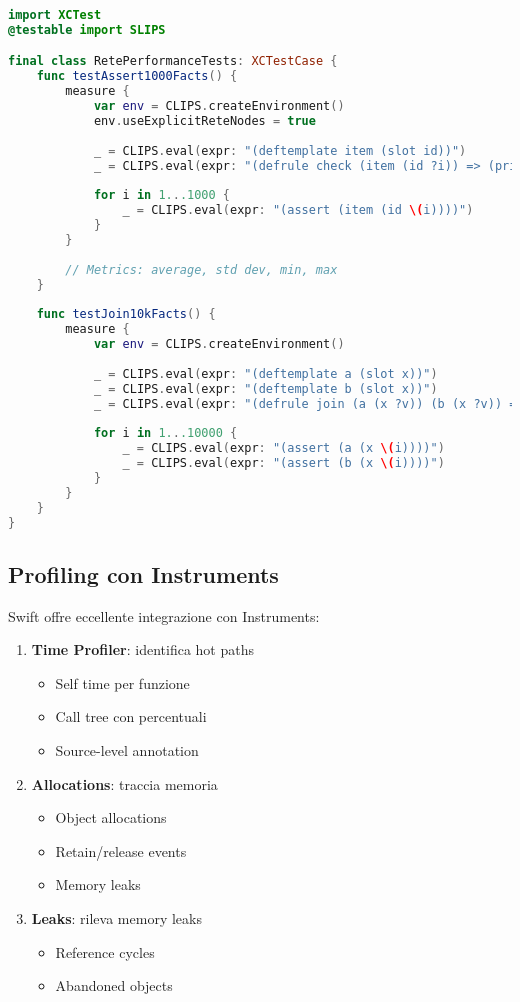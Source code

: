 \begin{lstlisting}[language=Swift]
import XCTest
@testable import SLIPS

final class RetePerformanceTests: XCTestCase {
    func testAssert1000Facts() {
        measure {
            var env = CLIPS.createEnvironment()
            env.useExplicitReteNodes = true
            
            _ = CLIPS.eval(expr: "(deftemplate item (slot id))")
            _ = CLIPS.eval(expr: "(defrule check (item (id ?i)) => (printout t ?i))")
            
            for i in 1...1000 {
                _ = CLIPS.eval(expr: "(assert (item (id \(i))))")
            }
        }
        
        // Metrics: average, std dev, min, max
    }
    
    func testJoin10kFacts() {
        measure {
            var env = CLIPS.createEnvironment()
            
            _ = CLIPS.eval(expr: "(deftemplate a (slot x))")
            _ = CLIPS.eval(expr: "(deftemplate b (slot x))")
            _ = CLIPS.eval(expr: "(defrule join (a (x ?v)) (b (x ?v)) => (printout t ?v))")
            
            for i in 1...10000 {
                _ = CLIPS.eval(expr: "(assert (a (x \(i))))")
                _ = CLIPS.eval(expr: "(assert (b (x \(i))))")
            }
        }
    }
}
\end{lstlisting}

\subsection{Profiling con Instruments}

Swift offre eccellente integrazione con Instruments:

\begin{enumerate}
\item \textbf{Time Profiler}: identifica hot paths
   \begin{itemize}
   \item Self time per funzione
   \item Call tree con percentuali
   \item Source-level annotation
   \end{itemize}

\item \textbf{Allocations}: traccia memoria
   \begin{itemize}
   \item Object allocations
   \item Retain/release events
   \item Memory leaks
   \end{itemize}

\item \textbf{Leaks}: rileva memory leaks
   \begin{itemize}
   \item Reference cycles
   \item Abandoned objects
   \end{itemize}
\end{enumerate}

